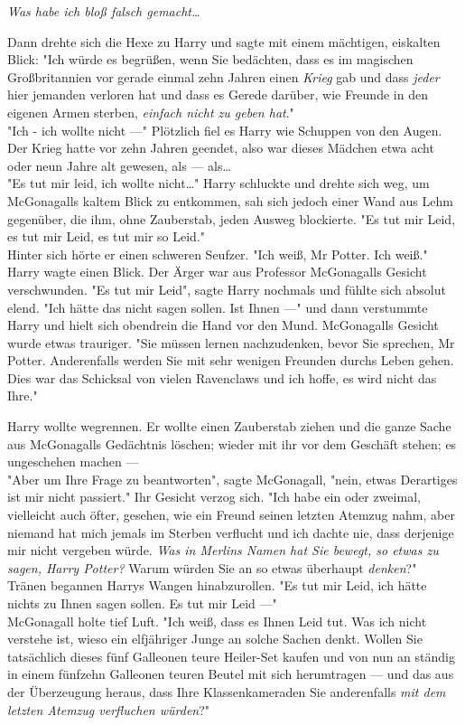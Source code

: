 {\emph{Was habe ich bloß falsch gemacht…}

Dann drehte sich die Hexe zu Harry und sagte mit einem mächtigen, eiskalten Blick: "Ich würde es begrüßen, wenn Sie bedächten, dass es im magischen Großbritannien vor gerade einmal zehn Jahren einen \emph{Krieg} gab und dass \emph{jeder} hier jemanden verloren hat und dass es Gerede darüber, wie Freunde in den eigenen Armen sterben, \emph{einfach nicht zu geben hat}."\\ "Ich - ich wollte nicht ---" Plötzlich fiel es Harry wie Schuppen von den Augen. Der Krieg hatte vor zehn Jahren geendet, also war dieses Mädchen etwa acht oder neun Jahre alt gewesen, als --- als…\\ "Es tut mir leid, ich wollte nicht…" Harry schluckte und drehte sich weg, um McGonagalls kaltem Blick zu entkommen, sah sich jedoch einer Wand aus Lehm gegenüber, die ihm, ohne Zauberstab, jeden Ausweg blockierte. "Es tut mir Leid, es tut mir Leid, es tut mir so Leid."\\ Hinter sich hörte er einen schweren Seufzer. "Ich weiß, Mr Potter. Ich weiß."\\ Harry wagte einen Blick. Der Ärger war aus Professor McGonagalls Gesicht verschwunden. "Es tut mir Leid", sagte Harry nochmals und fühlte sich absolut elend. "Ich hätte das nicht sagen sollen. Ist Ihnen ---" und dann verstummte Harry und hielt sich obendrein die Hand vor den Mund. McGonagalls Gesicht wurde etwas trauriger. "Sie müssen lernen nachzudenken, bevor Sie sprechen, Mr Potter. Anderenfalls werden Sie mit sehr wenigen Freunden durchs Leben gehen. Dies war das Schicksal von vielen Ravenclaws und ich hoffe, es wird nicht das Ihre."

Harry wollte wegrennen. Er wollte einen Zauberstab ziehen und die ganze Sache aus McGonagalls Gedächtnis löschen; wieder mit ihr vor dem Geschäft stehen; es ungeschehen machen ---\\ "Aber um Ihre Frage zu beantworten", sagte McGonagall, "nein, etwas Derartiges ist mir nicht passiert." Ihr Gesicht verzog sich. "Ich habe ein oder zweimal, vielleicht auch öfter, gesehen, wie ein Freund seinen letzten Atemzug nahm, aber niemand hat mich jemals im Sterben verflucht und ich dachte nie, dass derjenige mir nicht vergeben würde. \emph{Was in Merlins Namen hat Sie bewegt, so etwas zu sagen, Harry Potter?} Warum würden Sie an so etwas überhaupt \emph{denken}?"\\ Tränen begannen Harrys Wangen hinabzurollen. "Es tut mir Leid, ich hätte nichts zu Ihnen sagen sollen. Es tut mir Leid ---"\\ McGonagall holte tief Luft. "Ich weiß, dass es Ihnen Leid tut. Was ich nicht verstehe ist, wieso ein elfjähriger Junge an solche Sachen denkt. Wollen Sie tatsächlich dieses fünf Galleonen teure Heiler-Set kaufen und von nun an ständig in einem fünfzehn Galleonen teuren Beutel mit sich herumtragen --- und das aus der Überzeugung heraus, dass Ihre Klassenkameraden Sie anderenfalls \emph{mit dem letzten Atemzug verfluchen würden}?"

}
